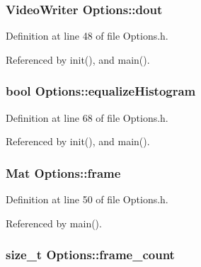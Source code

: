 \hypertarget{class_options_ac7d37c6cfee9fe03a81c4f0ee7675c75}{
\subsubsection[{dout}]{\setlength{\rightskip}{0pt plus 5cm}\-Video\-Writer {\bf \-Options\-::dout}}}
\label{class_options_ac7d37c6cfee9fe03a81c4f0ee7675c75}


\-Definition at line 48 of file \-Options.\-h.



\-Referenced by init(), and main().

\hypertarget{class_options_af486b12e9d1b38aabcb1dd43a3c1e793}{
\subsubsection[{equalize\-Histogram}]{\setlength{\rightskip}{0pt plus 5cm}bool {\bf \-Options\-::equalize\-Histogram}}}
\label{class_options_af486b12e9d1b38aabcb1dd43a3c1e793}


\-Definition at line 68 of file \-Options.\-h.



\-Referenced by init(), and main().

\hypertarget{class_options_a646673694931bcbc0065c55738e3dd29}{
\subsubsection[{frame}]{\setlength{\rightskip}{0pt plus 5cm}\-Mat {\bf \-Options\-::frame}}}
\label{class_options_a646673694931bcbc0065c55738e3dd29}


\-Definition at line 50 of file \-Options.\-h.



\-Referenced by main().

\hypertarget{class_options_ae7e3cc6bb484ec7e060175d5c6be9fbf}{
\subsubsection[{frame\-\_\-count}]{\setlength{\rightskip}{0pt plus 5cm}size\-\_\-t {\bf \-Options\-::frame\-\_\-count}}}
\label{class_options_ae7e3cc6bb484ec7e060175d5c6be9fbf}



